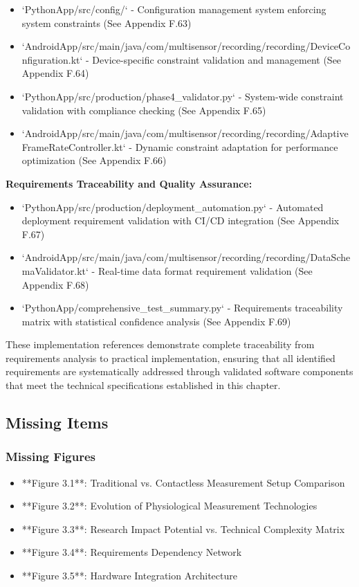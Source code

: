 \documentclass[12pt,a4paper]{article}
\begin{document}
\begin{itemize}
\item `PythonApp/src/config/` - Configuration management system enforcing system constraints (See Appendix F.63)
\item `AndroidApp/src/main/java/com/multisensor/recording/recording/DeviceConfiguration.kt` - Device-specific constraint
  validation and management (See Appendix F.64)
\item `PythonApp/src/production/phase4_validator.py` - System-wide constraint validation with compliance checking (See
  Appendix F.65)
\item `AndroidApp/src/main/java/com/multisensor/recording/recording/AdaptiveFrameRateController.kt` - Dynamic constraint
  adaptation for performance optimization (See Appendix F.66)

\end{itemize}
\textbf{Requirements Traceability and Quality Assurance:}

\begin{itemize}
\item `PythonApp/src/production/deployment_automation.py` - Automated deployment requirement validation with CI/CD
  integration (See Appendix F.67)
\item `AndroidApp/src/main/java/com/multisensor/recording/recording/DataSchemaValidator.kt` - Real-time data format
  requirement validation (See Appendix F.68)
\item `PythonApp/comprehensive_test_summary.py` - Requirements traceability matrix with statistical confidence analysis (See
  Appendix F.69)

\end{itemize}
These implementation references demonstrate complete traceability from requirements analysis to practical
implementation, ensuring that all identified requirements are systematically addressed through validated software
components that meet the technical specifications established in this chapter.

\subsection{Missing Items}

\subsubsection{Missing Figures}

\begin{itemize}
\item **Figure 3.1**: Traditional vs. Contactless Measurement Setup Comparison
\item **Figure 3.2**: Evolution of Physiological Measurement Technologies
\item **Figure 3.3**: Research Impact Potential vs. Technical Complexity Matrix
\item **Figure 3.4**: Requirements Dependency Network
\item **Figure 3.5**: Hardware Integration Architecture

\end{itemize}
\end{document}
